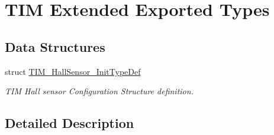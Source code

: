 \hypertarget{group___t_i_m_ex___exported___types}{}\section{T\+IM Extended Exported Types}
\label{group___t_i_m_ex___exported___types}
\subsection*{Data Structures}
\begin{DoxyCompactItemize}
\item 
struct \hyperlink{struct_t_i_m___hall_sensor___init_type_def}{T\+I\+M\+\_\+\+Hall\+Sensor\+\_\+\+Init\+Type\+Def}
\begin{DoxyCompactList}\small\item\em T\+IM Hall sensor Configuration Structure definition. \end{DoxyCompactList}\end{DoxyCompactItemize}


\subsection{Detailed Description}
